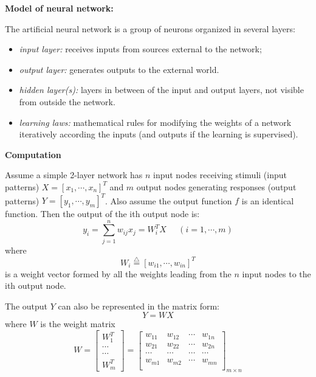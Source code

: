 {\bf Model of neural network:}


	The artificial neural network is a group of neurons organized in
	several layers:

	\begin{itemize}
	\item {\em input layer:} receives inputs from sources external to the
		network;
	\item {\em output layer:} generates outputs to the external world.

	\item {\em hidden layer(s):} layers in between of the input and output
		layers, not visible from outside the network.
	\item {\em learning laws:} mathematical rules for modifying the
		weights of a network iteratively according the inputs (and
		outputs if the learning is supervised).
	\end{itemize}

{\bf Computation}

Assume a simple 2-layer network has $n$ input nodes receiving stimuli (input 
patterns) $X=[x_1,\cdots,x_n]^T$ and $m$ output nodes generating responses
(output patterns)  $Y=[y_1,\cdots,y_m]^T$. Also assume the output function
$f$ is an identical function. Then the output of the ith output node is:
\[	y_i=\sum_{j=1}^n w_{ij} x_j=W_i^T X \;\;\;\;\;(i=1,\cdots,m) \]
where
\[	W_i\stackrel{\triangle}{=}[w_{i1},\cdots,w_{in} ]^T	\]
is a weight vector formed by all the weights leading from the $n$ input nodes 
to the ith output node.

The output $Y$ can also be represented in the matrix form:
\[	Y=WX	\]
where $W$ is the weight matrix
\[	W=\left[ \begin{array}{c}
		W_1^T	\\ \cdots \\ \cdots \\ W_m^T \end{array} \right]
	=\left[ \begin{array}{cccc}
		w_{11} & w_{12} & \cdots & w_{1n} \\
		w_{21} & w_{22} & \cdots & w_{2n} \\
		\cdots & \cdots & \cdots & \cdots \\
		w_{m1} & w_{m2} & \cdots & w_{mn} \\
	\end{array} \right]_{m \times n}
\]


\newpage
